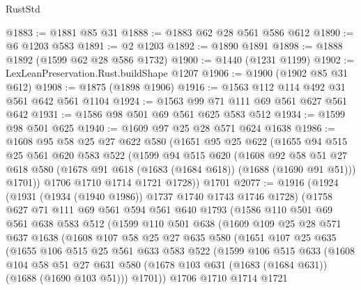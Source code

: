 \begin{lexlean}{RustStd}
\begin{coremodule}
@1883 := @1881 @85 @31
@1888 := @1883 @62 @28 @561 @586 @612
@1890 := @6 @1203 @583
@1891 := @2 @1203
@1892 := @1890 @1891
@1898 := @1888 @1892 (@1599 @62 @28 @586 @1732)
@1900 := @1440 (@1231 @1199)
@1902 := LexLeanPreservation.Rust.buildShape @1207
@1906 := @1900 (@1902 @85 @31 @612)
@1908 := @1875 (@1898 @1906)
@1916 := @1563 @112 @114 @492 @31 @561 @642 @561 @1104
@1924 := @1563 @99 @71 @111 @69 @561 @627 @561 @642
@1931 := @1586 @98 @501 @69 @561 @625 @583 @512
@1934 := @1599 @98 @501 @625
@1940 := @1609 @97 @25 @28 @571 @624 @1638
@1986 := @1608
    @95
    @58
    @25
    @27
    @622
    @580
    (@1651
      @95
      @25
      @622
      (@1655
        @94
        @515
        @25
        @561
        @620
        @583
        @522
        (@1599
          @94
          @515
          @620
          (@1608
            @92
            @58
            @51
            @27
            @618
            @580
            (@1678 @91 @618 (@1683 (@1684 @618)) (@1688 (@1690 @91 @51)))
            @1701))
        @1706
        @1710
        @1714
        @1721
        @1728))
    @1701
@2077 := @1916
    (@1924
      (@1931 (@1934 (@1940 @1986)) @1737 @1740 @1743 @1746 @1728)
      (@1758
        @627
        @71
        @111
        @69
        @561
        @594
        @561
        @640
        @1793
        (@1586
          @110
          @501
          @69
          @561
          @638
          @583
          @512
          (@1599
            @110
            @501
            @638
            (@1609
              @109
              @25
              @28
              @571
              @637
              @1638
              (@1608
                @107
                @58
                @25
                @27
                @635
                @580
                (@1651
                  @107
                  @25
                  @635
                  (@1655
                    @106
                    @515
                    @25
                    @561
                    @633
                    @583
                    @522
                    (@1599
                      @106
                      @515
                      @633
                      (@1608
                        @104
                        @58
                        @51
                        @27
                        @631
                        @580
                        (@1678 @103 @631 (@1683 (@1684 @631)) (@1688 (@1690 @103 @51)))
                        @1701))
                    @1706
                    @1710
                    @1714
                    @1721

\end{coremodule}
\end{lexlean}

